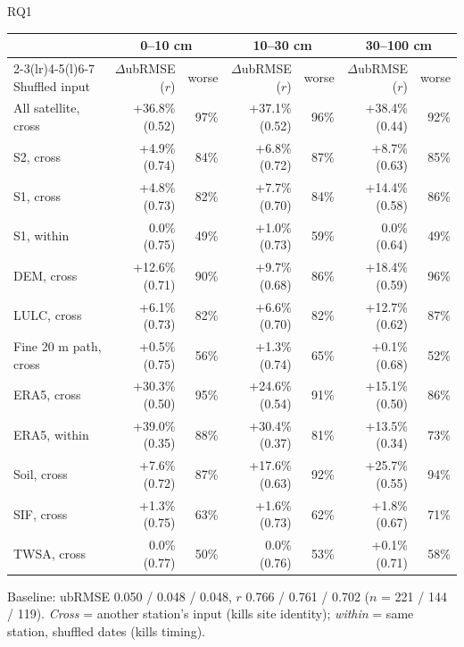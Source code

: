 \documentclass[aspectratio=169,10pt]{beamer}
\begin{document}
\begin{frame}{RQ1}
\scriptsize
\centering
\begin{tabular}{@{}l rr rr rr@{}}
\toprule
 & \multicolumn{2}{c}{0--10 cm} & \multicolumn{2}{c}{10--30 cm} & \multicolumn{2}{c}{30--100 cm} \\
\cmidrule(lr){2-3}\cmidrule(lr){4-5}\cmidrule(l){6-7}
Shuffled input & $\Delta$ubRMSE ($r$) & worse & $\Delta$ubRMSE ($r$) & worse & $\Delta$ubRMSE ($r$) & worse \\
\midrule
All satellite, cross   & +36.8\% (0.52) & 97\% & +37.1\% (0.52) & 96\% & +38.4\% (0.44) & 92\% \\
S2, cross              & +4.9\% (0.74)  & 84\% & +6.8\% (0.72)  & 87\% & +8.7\% (0.63)  & 85\% \\
S1, cross              & +4.8\% (0.73)  & 82\% & +7.7\% (0.70)  & 84\% & +14.4\% (0.58) & 86\% \\
S1, within             & 0.0\% (0.75)   & 49\% & +1.0\% (0.73)  & 59\% & 0.0\% (0.64)   & 49\% \\
DEM, cross             & +12.6\% (0.71) & 90\% & +9.7\% (0.68)  & 86\% & +18.4\% (0.59) & 96\% \\
LULC, cross            & +6.1\% (0.73)  & 82\% & +6.6\% (0.70)  & 82\% & +12.7\% (0.62) & 87\% \\
Fine 20 m path, cross  & +0.5\% (0.75)  & 56\% & +1.3\% (0.74)  & 65\% & +0.1\% (0.68)  & 52\% \\
\midrule
ERA5, cross            & +30.3\% (0.50) & 95\% & +24.6\% (0.54) & 91\% & +15.1\% (0.50) & 86\% \\
ERA5, within           & +39.0\% (0.35) & 88\% & +30.4\% (0.37) & 81\% & +13.5\% (0.34) & 73\% \\
Soil, cross            & +7.6\% (0.72)  & 87\% & +17.6\% (0.63) & 92\% & +25.7\% (0.55) & 94\% \\
SIF, cross             & +1.3\% (0.75)  & 63\% & +1.6\% (0.73)  & 62\% & +1.8\% (0.67)  & 71\% \\
TWSA, cross            & 0.0\% (0.77)   & 50\% & 0.0\% (0.76)   & 53\% & +0.1\% (0.71)  & 58\% \\
\bottomrule
\end{tabular}

\vspace{4pt}
\raggedright
Baseline: ubRMSE 0.050 / 0.048 / 0.048, $r$ 0.766 / 0.761 / 0.702 ($n$ = 221 / 144 / 119).
\emph{Cross} = another station's input (kills site identity); \emph{within} = same station, shuffled dates (kills timing).
\end{frame}
\end{document}
